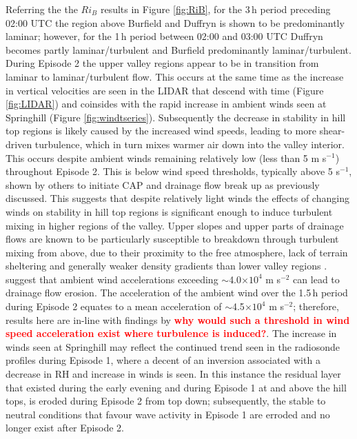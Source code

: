 \documentclass[times]{qjrms4}
\begin{document}
Referring the the $Ri_{B}$ results in Figure \ref{fig:RiB}, for the 3$\,\mbox{h}$ period preceding 02:00 UTC the region above Burfield and Duffryn is shown to be predominantly laminar; however, for the 1$\,\mbox{h}$ period between 02:00 and 03:00 UTC Duffryn becomes partly laminar/turbulent and Burfield predominantly laminar/turbulent. During Episode 2 the upper valley regions appear to be in transition from laminar to laminar/turbulent flow. This occurs at the same time as the increase in vertical velocities are seen in the LIDAR that descend with time (Figure \ref{fig:LIDAR}) and coinsides with the rapid increase in ambient winds seen at Springhill (Figure \ref{fig:windtseries}). Subsequently the decrease in stability in hill top regions is likely caused by the increased wind speeds, leading to more shear-driven turbulence, which in turn mixes warmer air down into the valley interior. This occurs despite ambient winds remaining relatively low (less than 5 m s$^{-1}$) throughout Episode 2. This is below wind speed thresholds, typically above 5 s$^{-1}$, shown by others to initiate CAP and drainage flow break up as previously discussed. This suggests that despite relatively light winds the effects of changing winds on stability in hill top regions is significant enough to induce turbulent mixing in higher regions of the valley. Upper slopes and upper parts of drainage flows are known to be particularly susceptible to breakdown through turbulent mixing from above, due to their proximity to the free atmosphere, lack of terrain sheltering and generally weaker density gradients than lower valley regions \citep{barr1989influence,gudiksen1992measurements}. \citet{orgill1992mesoscale} suggest that ambient wind accelerations exceeding $\sim$4.0$\times10^4$ m s$^{-2}$ can lead to drainage flow erosion. The acceleration of the ambient wind over the 1.5$\,\mbox{h}$ period during Episode 2 equates to a mean acceleration of $\sim$4.5$\times10^4$ m s$^{-2}$; therefore, results here are in-line with findings by \citet{orgill1992mesoscale}\textcolor{red}{\bf why would such a threshold in wind speed acceleration exist where turbulence is induced?}. The increase in winds seen at Springhill may reflect the continued trend seen in the radiosonde profiles during Episode 1, where a decent of an inversion associated with a decrease in RH and increase in winds is seen. In this instance the residual layer that existed during the early evening and during Episode 1 at and above the hill tops, is eroded during Episode 2 from top down; subsequently, the stable to neutral conditions that favour wave activity in Episode 1 are erroded and no longer exist after Episode 2.
\end{document}
